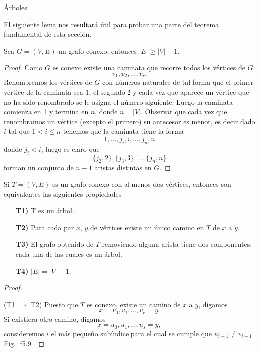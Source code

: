 \begin{section}{Árboles}

El siguiente lema nos resultará útil para probar una parte del teorema fundamental de esta sección.

\begin{lema}\label{conv} Sea $G=(V,E)$ un grafo conexo, entonces $|E| \ge |V| -1$.  
\end{lema}
\begin{proof} Como $G$ es conexo existe una caminata que recorre todos los vértices de $G$:
$$
v_1,v_2,\ldots,v_r.
$$
Renombremos los vértices de $G$ con números naturales de tal forma que el primer vértice de la caminata sea $1$, el segundo $2$ y cada vez que aparece un vértice que no ha sido renombrado se le asigna el número siguiente. Luego la caminata comienza en 1 y termina en $n$, donde $n = |V|$.  Observar que cada vez que renombramos un vértice (excepto el primero) su antecesor es menor, es decir dado $i$ tal que $1 < i \le n$ tenemos que la caminata tiene la forma
$$
1,\ldots,j_i,i,\ldots,j_n,n
$$ 
donde $j_i < i$, luego es claro  que 
$$
\{j_{2},2\}, \{j_{3},3\}, \ldots, \{j_{n},n\}
$$
forman un conjunto de $n-1$ aristas distintas en $G$. 
\end{proof}

\begin{teorema}\label{t5.5} Si $T=(V,E)$ es un grafo conexo con al menos dos
vértices, entonces son equivalentes las siguientes propiedades
\begin{enumerate}
\item[\bf T1)] T es un árbol.
\item[\bf T2)] \label{T2} Para cada par $x$, $y$ de vértices existe un único camino en $T$ de $x$ a
$y$.
\item[\bf T3)] \label{T3} El grafo obtenido de $T$ removiendo alguna arista tiene dos
componentes, cada una de las cuales es un árbol.
\item[\bf T4)] \label{T4} $|E|=|V|-1$.
\end{enumerate}
\end{teorema}
\begin{proof}
	\
	
\noindent (T1 $\Rightarrow$ T2) Puesto que $T$ es conexo, existe un
camino de $x$ a $y$, digamos
$$
x=v_0,v_1,\ldots,v_r=y.
$$
Si existiera otro camino, digamos
$$ x=u_0,u_1,\ldots,u_s=y,
$$
consideremos $i$ el más pequeño subíndice para el cual se cumple
que $u_{i+1}\not=v_{i+1}$ Fig. \ref{f5.9}.


\end{proof}
\end{section}
